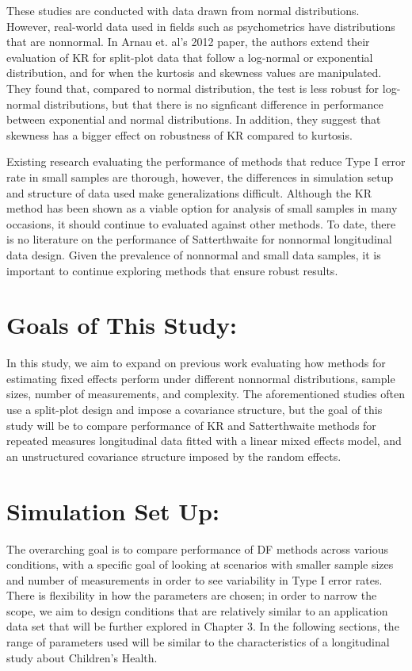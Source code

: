 \documentclass[12pt, twoside]{amherstthesis}
\begin{document}
These studies are conducted with data drawn from normal distributions. However, real-world data used in fields such as psychometrics have distributions that are nonnormal. In Arnau et. al's 2012 paper, the authors extend their evaluation of KR for split-plot data that follow a log-normal or exponential distribution, and for when the kurtosis and skewness values are manipulated. They found that, compared to normal distribution, the test is less robust for log-normal distributions, but that there is no signficant difference in performance between exponential and normal distributions. In addition, they suggest that skewness has a bigger effect on robustness of KR compared to kurtosis.

Existing research evaluating the performance of methods that reduce Type I error rate in small samples are thorough, however, the differences in simulation setup and structure of data used make generalizations difficult. Although the KR method has been shown as a viable option for analysis of small samples in many occasions, it should continue to evaluated against other methods. To date, there is no literature on the performance of Satterthwaite for nonnormal longitudinal data design. Given the prevalence of nonnormal and small data samples, it is important to continue exploring methods that ensure robust results.

\hypertarget{goals-of-this-study}{%
\section{Goals of This Study:}\label{goals-of-this-study}}

In this study, we aim to expand on previous work evaluating how methods for estimating fixed effects perform under different nonnormal distributions, sample sizes, number of measurements, and complexity. The aforementioned studies often use a split-plot design and impose a covariance structure, but the goal of this study will be to compare performance of KR and Satterthwaite methods for repeated measures longitudinal data fitted with a linear mixed effects model, and an unstructured covariance structure imposed by the random effects.

\hypertarget{simulation-set-up}{%
\section{Simulation Set Up:}\label{simulation-set-up}}

The overarching goal is to compare performance of DF methods across various conditions, with a specific goal of looking at scenarios with smaller sample sizes and number of measurements in order to see variability in Type I error rates. There is flexibility in how the parameters are chosen; in order to narrow the scope, we aim to design conditions that are relatively similar to an application data set that will be further explored in Chapter 3. In the following sections, the range of parameters used will be similar to the characteristics of a longitudinal study about Children's Health.
\end{document}
